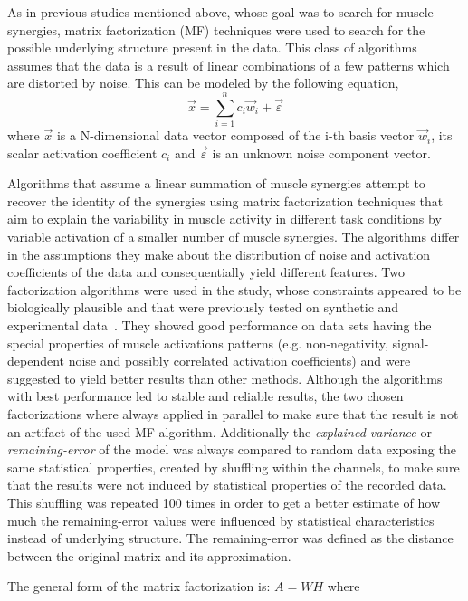 \documentclass[a4paper]{article}
\begin{document}
As in previous studies mentioned above, whose goal was to search for muscle synergies, matrix factorization (MF) techniques were used to search for the possible underlying structure present in the data. This class of algorithms assumes that the data is a result of linear combinations of a few patterns which are distorted by noise. This can be modeled by the following equation,
\begin{equation}
	\vec{x} = \sum_{i=1}^n c_{i} \vec{w}_{i} + \vec{\varepsilon}
\end{equation}
where $\vec{x}$ is a N-dimensional data vector composed of the i-th basis vector $\vec{w}_{i}$, its scalar activation coefficient $c_{i}$ 
and $\vec{\varepsilon}$ is an unknown noise component vector.


Algorithms that assume a linear summation of muscle synergies attempt to recover the identity of the synergies using matrix factorization techniques that aim to explain the variability in muscle activity in different task conditions by variable activation of a smaller number of muscle synergies. The algorithms differ in the assumptions they make about the distribution of noise and activation coefficients of the data and consequentially yield different features. Two factorization algorithms were used in the study, whose constraints appeared to be biologically plausible and that were previously tested on synthetic and experimental data~\cite{Tresch:2006p3766}. They showed good performance on data sets having the special properties of muscle activations patterns (e.g. non-negativity, signal-dependent noise and possibly correlated activation coefficients) and were suggested to yield better results than other methods. Although the algorithms with best performance led to stable and reliable results, the two chosen factorizations where always applied in parallel to make sure that the result is not an artifact of the used MF-algorithm.
Additionally the \emph{explained variance} or \emph{remaining-error} of the model was always compared to random data exposing the same statistical properties, created by shuffling within the channels, to make sure that the results were not induced by statistical properties of the recorded data. This shuffling was repeated 100 times in order to get a better estimate of how much the remaining-error values were influenced by statistical characteristics instead of underlying structure. The remaining-error was defined as the distance between the original matrix and its approximation. 

The general form of the matrix factorization is: $A = W H$ where 
\end{document}
